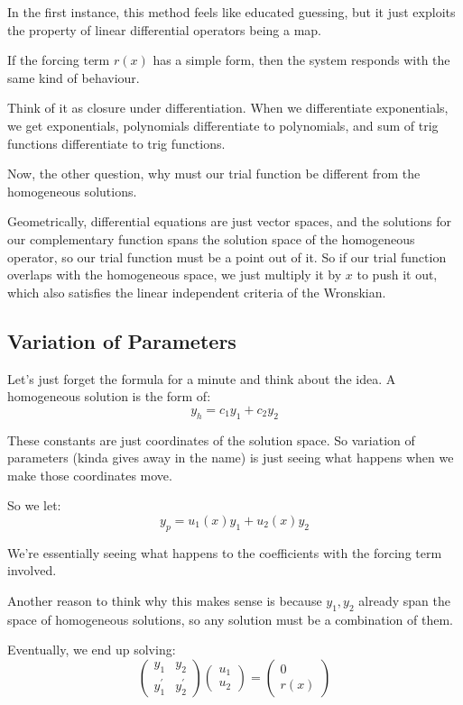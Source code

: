 In the first instance, this method feels like educated guessing, but it just exploits the property of linear differential operators being a map. 

If the forcing term $r(x)$ has a simple form, then the system responds with the same kind of behaviour. 

Think of it as closure under differentiation. When we differentiate exponentials, we get exponentials, polynomials differentiate to polynomials, and sum of trig functions differentiate to trig functions. 

Now, the other question, why must our trial function be different from the homogeneous solutions. 

Geometrically, differential equations are just vector spaces, and the solutions for our complementary function spans the solution space of the homogeneous operator, so our trial function must be a point out of it. So if our trial function overlaps with the homogeneous space, we just multiply it by $x$ to push it out, which also satisfies the linear independent criteria of the Wronskian. 

\subsection{Variation of Parameters}

Let's just forget the formula for a minute and think about the idea. A homogeneous solution is the form of: 
$$
y_h = c_1y_1 + c_2y_2
$$

These constants are just coordinates of the solution space. So variation of parameters (kinda gives away in the name) is just seeing what happens when we make those coordinates move. 

So we let: 
$$
y_p = u_1(x)y_1 + u_2(x) y_2
$$

We're essentially seeing what happens to the coefficients with the forcing term involved. 

Another reason to think why this makes sense is because $y_1, y_2$ already span the space of homogeneous solutions, so any solution must be a combination of them. 

Eventually, we end up solving: 
$$
\begin{pmatrix}
    y_1 & y_2 \\
    y^{\prime}_1 & y^{\prime}_2 
\end{pmatrix}
\begin{pmatrix}
    u_1 \\
    u_2
\end{pmatrix}
= \begin{pmatrix}
    0 \\ 
    r(x)
\end{pmatrix}
$$

